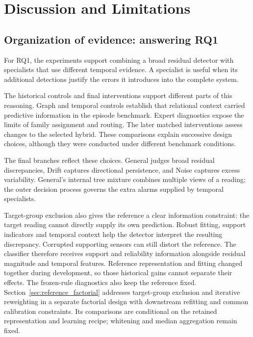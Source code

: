 \chapter{Discussion and Limitations}
\label{ch:discussion}

\section{Organization of evidence: answering RQ1}
For RQ1, the experiments support combining a broad residual detector with specialists that use different temporal evidence. A specialist is useful when its additional detections justify the errors it introduces into the complete system.

The historical controls and final interventions support different parts of this reasoning. Graph and temporal controls establish that relational context carried predictive information in the episode benchmark. Expert diagnostics expose the limits of family assignment and routing. The later matched interventions assess changes to the selected hybrid. These comparisons explain successive design choices, although they were conducted under different benchmark conditions.

The final branches reflect these choices. General judges broad residual discrepancies, Drift captures directional persistence, and Noise captures excess variability. General's internal tree mixture combines multiple views of a reading; the outer decision process governs the extra alarms supplied by temporal specialists.

Target-group exclusion also gives the reference a clear information constraint: the target reading cannot directly supply its own prediction. Robust fitting, support indicators and temporal context help the detector interpret the resulting discrepancy. Corrupted supporting sensors can still distort the reference. The classifier therefore receives support and reliability information alongside residual magnitude and temporal features. Reference representation and fitting changed together during development, so those historical gains cannot separate their effects. The frozen-rule diagnostics also keep the reference fixed. Section~\ref{sec:reference_factorial} addresses target-group exclusion and iterative reweighting in a separate factorial design with downstream refitting and common calibration constraints. Its comparisons are conditional on the retained representation and learning recipe; whitening and median aggregation remain fixed.

